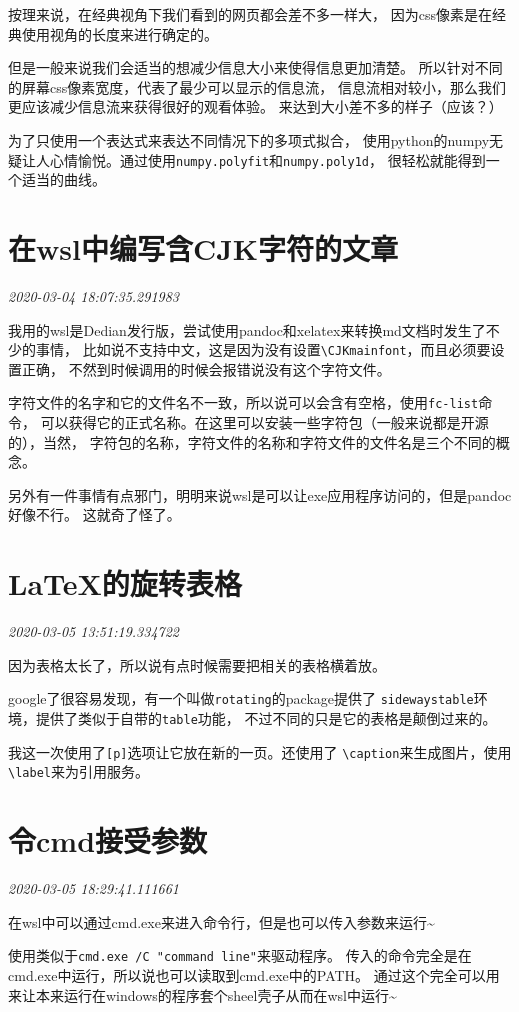 \documentclass{peterlitsdoc}
\newcommand{\timetx}[1]
    {\par\noindent\emph{\pltgray\small #1}\vspace{2em}}
\newcommand{\vb}{\verb}
\begin{document}
按理来说，在经典视角下我们看到的网页都会差不多一样大，
因为css像素是在经典使用视角的长度来进行确定的。

但是一般来说我们会适当的想减少信息大小来使得信息更加清楚。
所以针对不同的屏幕css像素宽度，代表了最少可以显示的信息流，
信息流相对较小，那么我们更应该减少信息流来获得很好的观看体验。
来达到大小差不多的样子（应该？）

为了只使用一个表达式来表达不同情况下的多项式拟合，
使用python的numpy无疑让人心情愉悦。通过使用\vb|numpy.polyfit|和\vb|numpy.poly1d|，
很轻松就能得到一个适当的曲线。


\section{在wsl中编写含CJK字符的文章}\timetx{2020-03-04 18:07:35.291983}

我用的wsl是Dedian发行版，尝试使用pandoc和xelatex来转换md文档时发生了不少的事情，
比如说不支持中文，这是因为没有设置\vb|\CJKmainfont|，而且必须要设置正确，
不然到时候调用的时候会报错说没有这个字符文件。

字符文件的名字和它的文件名不一致，所以说可以会含有空格，使用\vb|fc-list|命令，
可以获得它的正式名称。在这里可以安装一些字符包（一般来说都是开源的），当然，
字符包的名称，字符文件的名称和字符文件的文件名是三个不同的概念。

另外有一件事情有点邪门，明明来说wsl是可以让exe应用程序访问的，但是pandoc好像不行。
这就奇了怪了。


\section{\LaTeX 的旋转表格}\timetx{2020-03-05 13:51:19.334722}

因为表格太长了，所以说有点时候需要把相关的表格横着放。

google了很容易发现，有一个叫做\vb|rotating|的package提供了
\vb|sidewaystable|环境，提供了类似于自带的\vb|table|功能，
不过不同的只是它的表格是颠倒过来的。

我这一次使用了\vb|[p]|选项让它放在新的一页。还使用了
\vb|\caption|来生成图片，使用\vb|\label|来为引用服务。


\section{令cmd接受参数}\timetx{2020-03-05 18:29:41.111661}

在wsl中可以通过cmd.exe来进入命令行，但是也可以传入参数来运行\~{}

使用类似于\vb|cmd.exe /C "command line"|来驱动程序。
传入的命令完全是在cmd.exe中运行，所以说也可以读取到cmd.exe中的PATH。
通过这个完全可以用来让本来运行在windows的程序套个sheel壳子从而在wsl中运行\~{}
\end{document}

